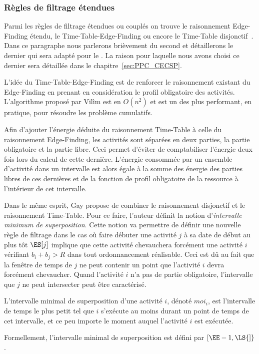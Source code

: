 \subsubsection{Règles de filtrage étendues}
\label{sec:mix_CUSP}

Parmi les règles de filtrage étendues ou couplés on trouve le
raisonnement Edge-Finding étendu, le Time-Table-Edge-Finding ou encore
le Time-Table disjonctif~\cite{Gay2015}. Dans ce paragraphe nous
parlerons brièvement du second et détaillerons le dernier qui sera
adapté pour le \CECSP. La raison pour laquelle nous avons choisi ce
dernier sera détaillée dans le chapitre~\ref{sec:PPC_CECSP}.

L'idée du Time-Table-Edge-Finding est de renforcer le raisonnement
existant du Edge-Finding en prenant en considération le profil
obligatoire des activités. L'algorithme proposé par Vil{\`i}m est en
$O(n^2)$ et est un des plus performant, en pratique, pour résoudre les
problème cumulatifs. 

Afin d'ajouter l'énergie déduite du raisonnement Time-Table à celle du
raisonnement Edge-Finding, les activités sont séparées en deux
parties, la partie obligatoire et la partie libre. Ceci permet
d'éviter de comptabiliser l'énergie deux fois lors du calcul de cette
dernière. L'énergie consommée par un ensemble d'activité dans un
intervalle est alors égale à la somme des énergie des parties libres
de ces dernières et de la fonction de profil obligatoire de la
ressource à l'intérieur de cet intervalle. 

Dans le même esprit, Gay propose de combiner le raisonnement
disjonctif et le raisonnement Time-Table. Pour ce faire, l'auteur
définit la notion d'{\it intervalle minimum de superposition}. Cette
notion va permettre de définir une nouvelle règle de filtrage dans le
cas où faire débuter une activité $j$ à sa date de début au plus tôt
$\ES[j]$ implique que cette activité chevauchera forcément une
activité $i$ vérifiant $b_i+b_j > R$ dans tout ordonnancement
réalisable. Ceci est dû au fait que la fenêtre de temps de $j$ ne peut
contenir un point que l'activité $i$ devra forcément chevaucher. Quand
l'activité $i$ n'a pas de partie obligatoire, l'intervalle que $j$ ne
peut intersecter peut être caractérisé. 

\begin{defi}
\label{des:moi_CUSP} 
L'intervalle minimal de superposition d’une activité $i$, dénoté
$moi_i$, est l’intervalle de temps le plus petit tel que $i$ s’exécute
au moins durant un point de temps de cet intervalle, et ce peu importe
le moment auquel l'activité $i$ est exécutée.  

Formellement,  l’intervalle minimal de superposition est défini par
$[\EE-1,\LS{]}$.
\end{defi}

